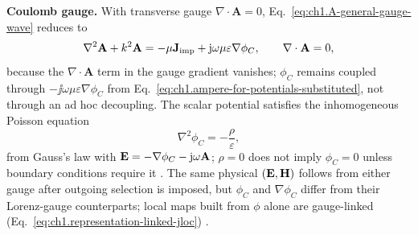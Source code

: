 \textbf{Coulomb gauge.} With transverse gauge $\nabla\cdot\mathbf{A}=0$, Eq.~\eqref{eq:ch1.A-general-gauge-wave} reduces to
\begin{equation}
\label{eq:ch1.A-coulomb-wave}
\nabla^2\mathbf{A}+k^2\mathbf{A}
=-\mu\mathbf{J}_{\mathrm{imp}}+\mathrm{j}\omega\mu\varepsilon\nabla\phi_C,
\qquad \nabla\cdot\mathbf{A}=0,
\end{equation}
because the $\nabla\cdot\mathbf{A}$ term in the gauge gradient vanishes; $\phi_C$ remains coupled through $-\jj\omega\mu\varepsilon\nabla\phi_C$ from Eq.~\eqref{eq:ch1.ampere-for-potentials-substituted}, not through an ad hoc decoupling. The scalar potential satisfies the inhomogeneous Poisson equation
\begin{equation}
\label{eq:ch1.phi-coulomb-poisson}
\nabla^2\phi_C=-\frac{\rho}{\varepsilon},
\end{equation}
from Gauss's law with $\mathbf{E}=-\nabla\phi_C-\mathrm{j}\omega\mathbf{A}$; $\rho=0$ does not imply $\phi_C=0$ unless boundary conditions require it \cite{stratton1941,jackson1999}. The same physical $(\mathbf{E},\mathbf{H})$ follows from either gauge after outgoing selection is imposed, but $\phi_C$ and $\nabla\phi_C$ differ from their Lorenz-gauge counterparts; local maps built from $\phi$ alone are gauge-linked (Eq.~\eqref{eq:ch1.representation-linked-jloc}) \cite{belinfante1940,stratton1941}.

